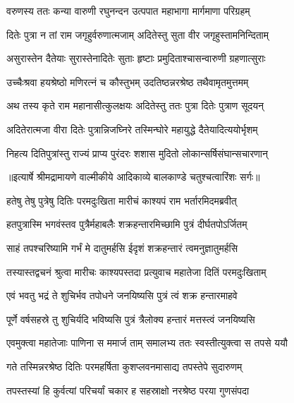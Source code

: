 \twolineshloka
{वरुणस्य ततः कन्या वारुणी रघुनन्दन}
{उत्पपात महाभागा मार्गमाणा परिग्रहम्} %

\twolineshloka
{दितेः पुत्रा न तां राम जगृहुर्वरुणात्मजाम्}
{अदितेस्तु सुता वीर जगृहुस्तामनिन्दिताम्} %

\twolineshloka
{असुरास्तेन दैतेयाः सुरास्तेनादितेः सुताः}
{हृष्टाः प्रमुदिताश्चासन्वारुणी ग्रहणात्सुराः} %

\twolineshloka
{उच्चैःश्रवा हयश्रेष्ठो मणिरत्नं च कौस्तुभम्}
{उदतिष्ठन्नरश्रेष्ठ तथैवामृतमुत्तमम्} %

\twolineshloka
{अथ तस्य कृते राम महानासीत्कुलक्षयः}
{अदितेस्तु ततः पुत्रा दितेः पुत्राण सूदयन्} %

\twolineshloka
{अदितेरात्मजा वीरा दितेः पुत्रान्निजघ्निरे}
{तस्मिन्घोरे महायुद्धे दैतेयादित्ययोर्भृशम्} %

\twolineshloka
{निहत्य दितिपुत्रांस्तु राज्यं प्राप्य पुरंदरः}
{शशास मुदितो लोकान्सर्षिसंघान्सचारणान्} %


{॥इत्यार्षे श्रीमद्रामायणे वाल्मीकीये आदिकाव्ये बालकाण्डे चतुश्चत्वारिंशः सर्गः॥}


\twolineshloka
{हतेषु तेषु पुत्रेषु दितिः परमदुःखिता}
{मारीचं काश्यपं राम भर्तारमिदमब्रवीत्} %

\twolineshloka
{हतपुत्रास्मि भगवंस्तव पुत्रैर्महाबलैः}
{शक्रहन्तारमिच्छामि पुत्रं दीर्घतपोऽर्जितम्} %

\twolineshloka
{साहं तपश्चरिष्यामि गर्भं मे दातुमर्हसि}
{ईदृशं शक्रहन्तारं त्वमनुज्ञातुमर्हसि} %

\twolineshloka
{तस्यास्तद्वचनं श्रुत्वा मारीचः काश्यपस्तदा}
{प्रत्युवाच महातेजा दितिं परमदुःखिताम्} %

\twolineshloka
{एवं भवतु भद्रं ते शुचिर्भव तपोधने}
{जनयिष्यसि पुत्रं त्वं शक्र हन्तारमाहवे} %

\twolineshloka
{पूर्णे वर्षसहस्रे तु शुचिर्यदि भविष्यसि}
{पुत्रं त्रैलोक्य हन्तारं मत्तस्त्वं जनयिष्यसि} %

\twolineshloka
{एवमुक्त्वा महातेजाः पाणिना स ममार्ज ताम्}
{समालभ्य ततः स्वस्तीत्युक्त्वा स तपसे ययौ} %

\twolineshloka
{गते तस्मिन्नरश्रेष्ठ दितिः परमहर्षिता}
{कुशप्लवनमासाद्य तपस्तेपे सुदारुणम्} %

\twolineshloka
{तपस्तस्यां हि कुर्वत्यां परिचर्यां चकार ह}
{सहस्राक्षो नरश्रेष्ठ परया गुणसंपदा} %

